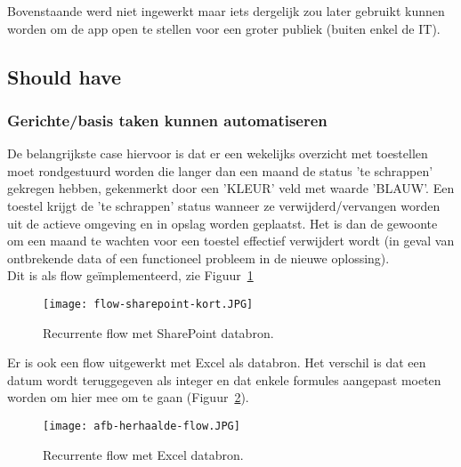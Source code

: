Bovenstaande werd niet ingewerkt maar iets dergelijk zou later gebruikt kunnen worden om de app open te stellen voor een groter publiek (buiten enkel de IT).

\subsection{Should have}

\subsubsection{Gerichte/basis taken kunnen automatiseren}

De belangrijkste case hiervoor is dat er een wekelijks overzicht met toestellen moet rondgestuurd worden die langer dan een maand de status 'te schrappen' gekregen hebben, gekenmerkt door een 'KLEUR' veld met waarde 'BLAUW'. Een toestel krijgt de 'te schrappen' status wanneer ze verwijderd/vervangen worden uit de actieve omgeving en in opslag worden geplaatst. Het is dan de gewoonte om een maand te wachten voor een toestel effectief verwijdert wordt (in geval van ontbrekende data of een functioneel probleem in de nieuwe oplossing).\\
Dit is als flow geïmplementeerd, zie Figuur~\ref{fig:flow-sharepoint-kort}

\begin{figure}[h!]
    \centering
    \texttt{[image: flow-sharepoint-kort.JPG]}
    \caption{Recurrente flow met SharePoint databron.}
    \label{fig:flow-sharepoint-kort}
\end{figure}

Er is ook een flow uitgewerkt met Excel als databron. Het verschil is dat een datum wordt teruggegeven als integer en dat enkele formules aangepast moeten worden om hier mee om te gaan (Figuur~\ref{fig:recurrent-flow-excel}). 

\begin{figure}[h!]
    \centering
    \texttt{[image: afb-herhaalde-flow.JPG]}
    \caption{Recurrente flow met Excel databron.}
    \label{fig:recurrent-flow-excel}
\end{figure}

